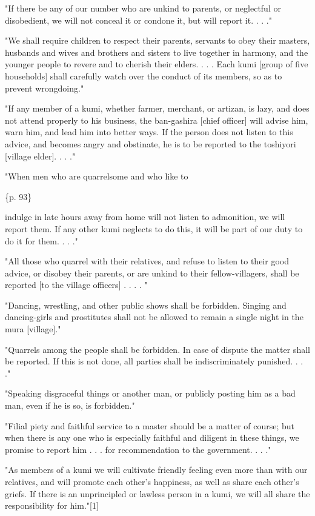 "If there be any of our number who are unkind to parents, or neglectful or disobedient, we will not conceal it or condone it, but will report it. . . ."

"We shall require children to respect their parents, servants to obey their masters, husbands and wives and brothers and sisters to live together in harmony, and the younger people to revere and to cherish their elders. . . . Each kumi [group of five households] shall carefully watch over the conduct of its members, so as to prevent wrongdoing."

"If any member of a kumi, whether farmer, merchant, or artizan, is lazy, and does not attend properly to his business, the ban-gashira [chief officer] will advise him, warn him, and lead him into better ways. If the person does not listen to this advice, and becomes angry and obstinate, he is to be reported to the toshiyori [village elder]. . . ."

"When men who are quarrelsome and who like to

\{p. 93\}

indulge in late hours away from home will not listen to admonition, we will report them. If any other kumi neglects to do this, it will be part of our duty to do it for them. . . ."

"All those who quarrel with their relatives, and refuse to listen to their good advice, or disobey their parents, or are unkind to their fellow-villagers, shall be reported [to the village officers] . . . . "

"Dancing, wrestling, and other public shows shall be forbidden. Singing and dancing-girls and prostitutes shall not be allowed to remain a single night in the mura [village]."

"Quarrels among the people shall be forbidden. In case of dispute the matter shall be reported. If this is not done, all parties shall be indiscriminately punished. . . ."

"Speaking disgraceful things or another man, or publicly posting him as a bad man, even if he is so, is forbidden."

"Filial piety and faithful service to a master should be a matter of course; but when there is any one who is especially faithful and diligent in these things, we promise to report him . . . for recommendation to the government. . . ."

"As members of a kumi we will cultivate friendly feeling even more than with our relatives, and will promote each other's happiness, as well as share each other's griefs. If there is an unprincipled or lawless person in a kumi, we will all share the responsibility for him."[1]

